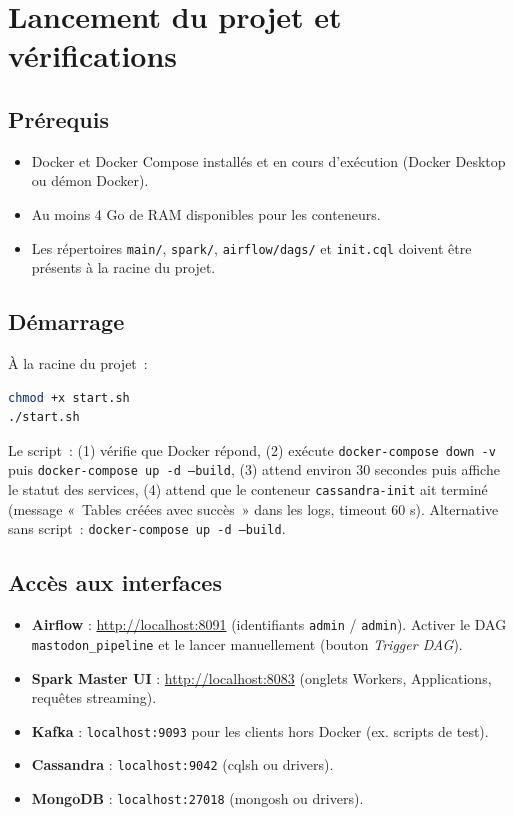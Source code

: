 \documentclass[12pt,a4paper]{article}
\begin{document}
\section{Lancement du projet et vérifications}

\subsection{Prérequis}

\begin{itemize}[leftmargin=*]
  \item Docker et Docker Compose installés et en cours d'exécution (Docker Desktop ou démon Docker).
  \item Au moins 4 Go de RAM disponibles pour les conteneurs.
  \item Les répertoires \texttt{main/}, \texttt{spark/}, \texttt{airflow/dags/} et \texttt{init.cql} doivent être présents à la racine du projet.
\end{itemize}

\subsection{Démarrage}

À la racine du projet~:

\begin{lstlisting}[language=bash,caption=Démarrage rapide]
chmod +x start.sh
./start.sh
\end{lstlisting}

Le script~: (1) vérifie que Docker répond, (2) exécute \texttt{docker-compose down -v} puis \texttt{docker-compose up -d --build}, (3) attend environ 30 secondes puis affiche le statut des services, (4) attend que le conteneur \texttt{cassandra-init} ait terminé (message «~Tables créées avec succès~» dans les logs, timeout 60 s). Alternative sans script~: \texttt{docker-compose up -d --build}.

\subsection{Accès aux interfaces}

\begin{itemize}[leftmargin=*]
  \item \textbf{Airflow} : \url{http://localhost:8091} (identifiants \texttt{admin} / \texttt{admin}). Activer le DAG \texttt{mastodon\_pipeline} et le lancer manuellement (bouton \emph{Trigger DAG}).
  \item \textbf{Spark Master UI} : \url{http://localhost:8083} (onglets Workers, Applications, requêtes streaming).
  \item \textbf{Kafka} : \texttt{localhost:9093} pour les clients hors Docker (ex. scripts de test).
  \item \textbf{Cassandra} : \texttt{localhost:9042} (cqlsh ou drivers).
  \item \textbf{MongoDB} : \texttt{localhost:27018} (mongosh ou drivers).
\end{itemize}
\end{document}
